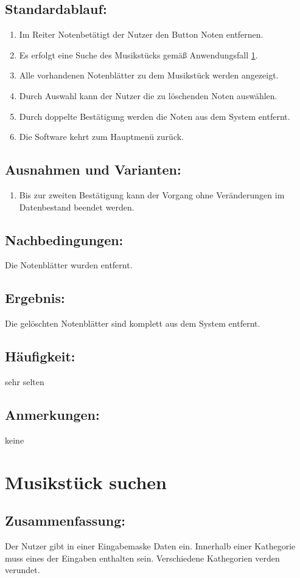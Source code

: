 \documentclass[a4paper,10pt]{scrartcl}
\begin{document}
\subsection{Standardablauf:}
\begin{enumerate}
	\item Im Reiter \glqq Noten\grqq betätigt der Nutzer den Button \glqq Noten entfernen\grqq.
	\item Es erfolgt eine Suche des Musikstücks gemäß Anwendungsfall \ref{uc musik suchen}.
	\item Alle vorhandenen Notenblätter zu dem Musikstück werden angezeigt.
	\item Durch Auswahl kann der Nutzer die zu löschenden Noten auswählen.
	\item Durch doppelte Bestätigung werden die Noten aus dem System entfernt.
	\item Die Software kehrt zum Hauptmenü zurück.
\end{enumerate}
\subsection{Ausnahmen und Varianten:}
\begin{enumerate}
	\item Bis zur zweiten Bestätigung kann der Vorgang ohne Veränderungen im Datenbestand beendet werden.
\end{enumerate}
\subsection{Nachbedingungen:}
Die Notenblätter wurden entfernt.
\subsection{Ergebnis:}
Die gelöschten Notenblätter sind komplett aus dem System entfernt.
\subsection{Häufigkeit:}
sehr selten
\subsection{Anmerkungen:}
keine
\newpage

\section{Musikstück suchen}
\label{uc musik suchen}
\subsection{Zusammenfassung:}
Der Nutzer gibt in einer Eingabemaske Daten ein. Innerhalb einer Kathegorie muss eines der Eingaben enthalten sein. Verschiedene Kathegorien verden verundet.
\end{document}
